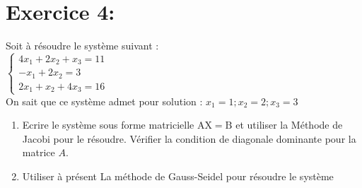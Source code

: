 \documentclass[10pt]{article}
\begin{document}
\section*{Exercice 4:}
Soit à résoudre le système suivant :\\
\(\left\{\begin{array}{c}4 x_{1}+2 x_{2}+x_{3}=11 \\ -x_{1}+2 x_{2}=3 \\ 2 x_{1}+x_{2}+4 x_{3}=16\end{array}\right.\)\\
On sait que ce système admet pour solution : \(x_{1}=1 ; x_{2}=2 ; x_{3}=3\)

\begin{enumerate}
  \item Ecrire le système sous forme matricielle \(\mathrm{AX}=\mathrm{B}\) et utiliser la Méthode de Jacobi pour le résoudre. Vérifier la condition de diagonale dominante pour la matrice \(A\).
  \item Utiliser à présent La méthode de Gauss-Seidel pour résoudre le système
\end{enumerate}
\end{document}
